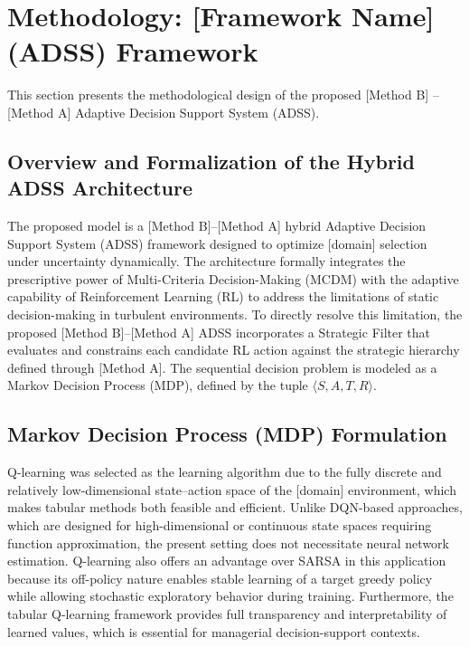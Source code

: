 \documentclass[10pt,twocolumn]{article}
\begin{document}
\section{Methodology: [Framework Name] (ADSS) Framework}

This section presents the methodological design of the proposed
[Method B] -- [Method A] Adaptive Decision Support System (ADSS).

\subsection{Overview and Formalization of the Hybrid ADSS
Architecture}

The proposed model is a [Method B]--[Method A] hybrid Adaptive
Decision Support System (ADSS) framework designed to optimize
[domain] selection under uncertainty dynamically. The architecture
formally integrates the prescriptive power of Multi-Criteria
Decision-Making (MCDM) with the adaptive capability of
Reinforcement Learning (RL) to address the limitations of static
decision-making in turbulent environments. To directly resolve
this limitation, the proposed [Method B]--[Method A] ADSS
incorporates a Strategic Filter that evaluates and constrains each
candidate RL action against the strategic hierarchy defined
through [Method A]. The sequential decision problem is modeled as
a Markov Decision Process (MDP), defined by the tuple
$\langle S, A, T, R \rangle$.

\subsection{Markov Decision Process (MDP) Formulation}

Q-learning was selected as the learning algorithm due to the fully
discrete and relatively low-dimensional state--action space of the
[domain] environment, which makes tabular methods both feasible and
efficient. Unlike DQN-based approaches, which are designed for
high-dimensional or continuous state spaces requiring function
approximation, the present setting does not necessitate neural
network estimation. Q-learning also offers an advantage over SARSA
in this application because its off-policy nature enables stable
learning of a target greedy policy while allowing stochastic
exploratory behavior during training. Furthermore, the tabular
Q-learning framework provides full transparency and
interpretability of learned values, which is essential for
managerial decision-support contexts.
\end{document}
